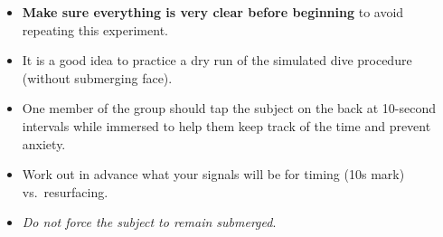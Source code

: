 \documentclass[
  letterpaper,
  DIV=11,
  numbers=noendperiod,
  oneside]{scrartcl}
\providecommand{\tightlist}{%
  \setlength{\itemsep}{0pt}\setlength{\parskip}{0pt}}\usepackage{longtable,booktabs,array}
\begin{document}
\begin{tcolorbox}[enhanced jigsaw, opacityback=0, colbacktitle=quarto-callout-note-color!10!white, opacitybacktitle=0.6, colback=white, leftrule=.75mm, title=\textcolor{quarto-callout-note-color}{\faInfo}\hspace{0.5em}{NOTES:}, breakable, rightrule=.15mm, colframe=quarto-callout-note-color-frame, bottomrule=.15mm, bottomtitle=1mm, arc=.35mm, toptitle=1mm, titlerule=0mm, toprule=.15mm, left=2mm, coltitle=black]

\begin{itemize}
\tightlist
\item
  \textbf{Make sure everything is very clear before beginning} to avoid
  repeating this experiment.
\item
  It is a good idea to practice a dry run of the simulated dive
  procedure (without submerging face).
\item
  One member of the group should tap the subject on the back at
  10-second intervals while immersed to help them keep track of the time
  and prevent anxiety.
\item
  Work out in advance what your signals will be for timing (10s mark)
  vs.~resurfacing.
\item
  \emph{Do not force the subject to remain submerged}.\\
\end{itemize}

\end{tcolorbox}
\end{document}

